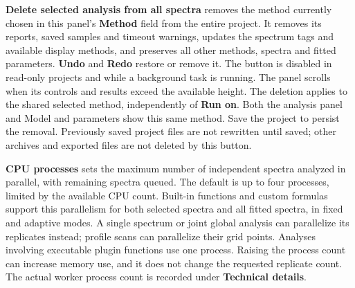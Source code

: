 \documentclass[
  10pt,
  a4paper,
  oneside]{scrreprt}
\begin{document}
\textbf{Delete selected analysis from all spectra} removes the method
currently chosen in this panel's \textbf{Method} field from the entire
project. It removes its reports, saved samples and timeout warnings,
updates the spectrum tags and available display methods, and preserves
all other methods, spectra and fitted parameters. \textbf{Undo} and
\textbf{Redo} restore or remove it. The button is disabled in read-only
projects and while a background task is running. The panel scrolls when
its controls and results exceed the available height. The deletion
applies to the shared selected method, independently of \textbf{Run on}.
Both the analysis panel and Model and parameters show this same method.
Save the project to persist the removal. Previously saved project files
are not rewritten until saved; other archives and exported files are not
deleted by this button.

\textbf{CPU processes} sets the maximum number of independent spectra
analyzed in parallel, with remaining spectra queued. The default is up
to four processes, limited by the available CPU count. Built-in
functions and custom formulas support this parallelism for both selected
spectra and all fitted spectra, in fixed and adaptive modes. A single
spectrum or joint global analysis can parallelize its replicates
instead; profile scans can parallelize their grid points. Analyses
involving executable plugin functions use one process. Raising the
process count can increase memory use, and it does not change the
requested replicate count. The actual worker process count is recorded
under \textbf{Technical details}.
\end{document}
